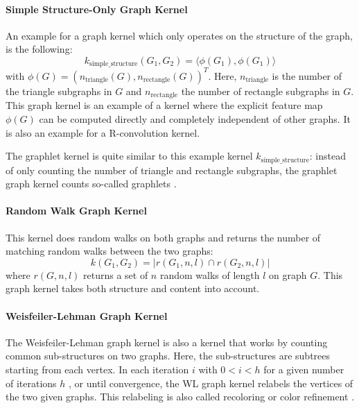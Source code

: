 \paragraph{Simple Structure-Only Graph Kernel}
An example for a graph kernel which only operates on the structure of the graph, is the following:
\begin{equation*}
k_{\mathrm{simple\_structure}}(G_1, G_2) = \langle \phi(G_1), \phi(G_1) \rangle
\end{equation*}
with $\phi(G) = (n_{\mathrm{triangle}}(G), n_{\mathrm{rectangle}}(G))^T$. Here, $n_{\mathrm{triangle}}$ is the number of the triangle subgraphs in $G$ and $n_{\mathrm{rectangle}}$ the number of rectangle subgraphs in $G$.
This graph kernel is an example of a kernel where the explicit feature map $\phi(G)$ can be computed directly and completely independent of other graphs.
It is also an example for a R-convolution kernel.

The graphlet kernel \cite{Shervashidze2009a} is quite similar to this example kernel $k_{\mathrm{simple\_structure}}$: instead of only counting the number of triangle and rectangle subgraphs, the graphlet graph kernel counts so-called graphlets \cite{Shervashidze2009a}.

\paragraph{Random Walk Graph Kernel}
This kernel does random walks on both graphs and returns the number of matching random walks between the two graphs:
\begin{equation*}
    k(G_1, G_2) = |r(G_1, n, l) \cap r(G_2, n, l)|
\end{equation*}
where $r(G, n, l)$ returns a set of $n$ random walks of length $l$ on graph $G$.
This graph kernel takes both structure and content into account.

\paragraph{Weisfeiler-Lehman Graph Kernel}
The Weisfeiler-Lehman graph kernel is also a kernel that works by counting common sub-structures on two graphs.
Here, the sub-structures are subtrees starting from each vertex.
In each iteration $i$ with $0 < i < h$ for a given number of iterations $h$ , or until convergence, the WL graph kernel relabels the vertices of the two given graphs.
This relabeling is also called recoloring or color refinement \cite{Kersting2013}.

